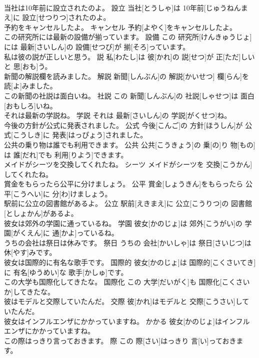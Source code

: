 \documentclass[8pt]{extreport}
\begin{document}
\begin{CJK}{UTF8}{min}
\\	当社は10年前に設立されたのよ。	設立	当社[とうしゃ]は 10年前[じゅうねんまえ]に 設立[せつりつ]されたのよ。	
\\	予約をキャンセルしたよ。	キャンセル	予約[よやく]をキャンセルしたよ。	
\\	この研究所には最新の設備が揃っています。	設備	この 研究所[けんきゅうじょ]には 最新[さいしん]の 設備[せつび]が 揃[そろ]っています。	
\\	私は彼の説が正しいと思う。	説	私[わたし]は 彼[かれ]の 説[せつ]が 正[ただ]しいと 思[おも]う。	
\\	新聞の解説欄を読みました。	解説	新聞[しんぶん]の 解説[かいせつ] 欄[らん]を 読[よ]みました。	
\\	この新聞の社説は面白いね。	社説	この 新聞[しんぶん]の 社説[しゃせつ]は 面白[おもしろ]いね。	
\\	それは最新の学説ね。	学説	それは 最新[さいしん]の 学説[がくせつ]ね。	
\\	今後の方針が公式に発表されました。	公式	今後[こんご]の 方針[ほうしん]が 公式[こうしき]に 発表[はっぴょう]されました。	
\\	公共の乗り物は誰でも利用できます。	公共	公共[こうきょう]の 乗[の]り 物[もの]は 誰[だれ]でも 利用[りよう]できます。	
\\	メイドがシーツを交換してくれたね。	シーツ	メイドがシーツを 交換[こうかん]してくれたね。	
\\	賞金をもらったら公平に分けましょう。	公平	賞金[しょうきん]をもらったら 公平[こうへい]に 分[わ]けましょう。	
\\	駅前に公立の図書館があるよ。	公立	駅前[えきまえ]に 公立[こうりつ]の 図書館[としょかん]があるよ。	
\\	彼女は郊外の学園に通っているね。	学園	彼女[かのじょ]は 郊外[こうがい]の 学園[がくえん]に 通[かよ]っているね。	
\\	うちの会社は祭日は休みです。	祭日	うちの 会社[かいしゃ]は 祭日[さいじつ]は 休[やす]みです。	
\\	彼女は国際的に有名な歌手です。	国際的	彼女[かのじょ]は 国際的[こくさいてき]に 有名[ゆうめい]な 歌手[かしゅ]です。	
\\	この大学も国際化してきたな。	国際化	この 大学[だいがく]も 国際化[こくさいか]してきたな。	
\\	彼はモデルと交際していたんだ。	交際	彼[かれ]はモデルと 交際[こうさい]していたんだ。	
\\	彼女はインフルエンザにかかっていますね。	かかる	彼女[かのじょ]はインフルエンザにかかっていますね。	
\\	この際はっきり言っておきます。	際	この 際[さい]はっきり 言[い]っておきます。	

\end{CJK}
\end{document}

